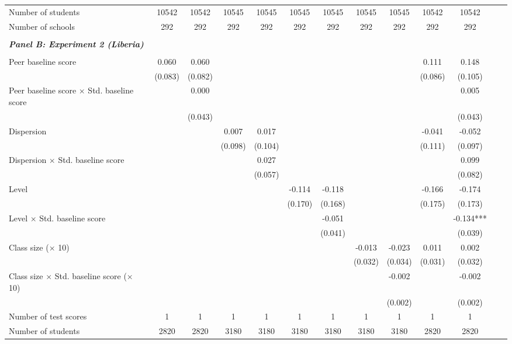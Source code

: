 \begin{center}
\begin{scriptsize}
\begin{threeparttable}
\begin{tabular} {@{} l l c c c c c c c c c c c  c@{}}
Number of students &  & 10542 & 10542 & 10545 & 10545 & 10545 & 10545 & 10545 & 10545 & 10542 & 10542 \\
Number of schools &  & 292 & 292 & 292 & 292 & 292 & 292 & 292 & 292 & 292 & 292 \\
 \midrule
\\
\multicolumn{3}{l}{\textbf{\textit{Panel B: Experiment 2 (Liberia)}}} \\
\\
Peer baseline score &  & 0.060 & 0.060 &  &  &  &  &  &  & 0.111 & 0.148 \\
                 &  & (0.083) & (0.082) &  &  &  &  &  &  & (0.086) & (0.105) \\
Peer baseline score $\times$ Std. baseline score &  &  & 0.000 &  &  &  &  &  &  &  & 0.005 \\
                 &  &  & (0.043) &  &  &  &  &  &  &  & (0.043) \\
Dispersion &  &  &  & 0.007 & 0.017 &  &  &  &  & -0.041 & -0.052 \\
                 &  &  &  & (0.098) & (0.104) &  &  &  &  & (0.111) & (0.097) \\
Dispersion $\times$ Std. baseline score &  &  &  &  & 0.027 &  &  &  &  &  & 0.099 \\
                 &  &  &  &  & (0.057) &  &  &  &  &  & (0.082) \\
Level &  &  &  &  &  & -0.114 & -0.118 &  &  & -0.166 & -0.174 \\
                 &  &  &  &  &  & (0.170) & (0.168) &  &  & (0.175) & (0.173) \\
Level $\times$ Std. baseline score &  &  &  &  &  &  & -0.051 &  &  &  & -0.134*** \\
                 &  &  &  &  &  &  & (0.041) &  &  &  & (0.039) \\
Class size ($\times$ 10) &  &  &  &  &  &  &  & -0.013 & -0.023 & 0.011 & 0.002 \\
                 &  &  &  &  &  &  &  & (0.032) & (0.034) & (0.031) & (0.032) \\
Class size $\times$ Std. baseline score ($\times$ 10) &  &  &  &  &  &  &  &  & -0.002 &  & -0.002 \\
                 &  &  &  &  &  &  &  &  & (0.002) &  & (0.002) \\
\midrule
Number of test scores &  & 1 & 1 & 1 & 1 & 1 & 1 & 1 & 1 & 1 & 1 \\
Number of students &  & 2820 & 2820 & 3180 & 3180 & 3180 & 3180 & 3180 & 3180 & 2820 & 2820 \\

\end{tabular}
\end{threeparttable}
\end{scriptsize}
\end{center}
